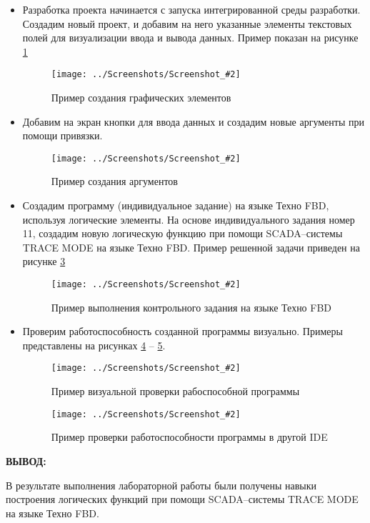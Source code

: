 \documentclass[14pt,a4paper]{extreport}
\newcommand{\sshot}[2]{\begin{figure}[ht]%
\centering\texttt{[image: ../Screenshots/Screenshot\_\#2]}%
\caption{#1}%
\label{sshot#2}%
\end{figure}%
}
\newcommand{\header}[1]{%
{
\clearpage%
\fontsize{16pt}{14pt}\selectfont
\begin{center}
\textbf{\MakeUppercase{#1}:}
\end{center}
}
}
\begin{document}
\begin{itemize}

\item Разработка проекта начинается с запуска интегрированной среды разработки. Создадим новый проект, и добавим на него указанные элементы текстовых полей для визуализации ввода и вывода данных. Пример показан на рисунке \ref{sshot1}

\sshot{Пример создания графических элементов}{1}

\item Добавим на экран кнопки для ввода данных и создадим новые аргументы при помощи привязки. 

\sshot{Пример создания аргументов}{2}

\clearpage

\item Создадим программу (индивидуальное задание) на языке Техно FBD, используя логические элементы. На основе индивидуального задания номер 11, создадим новую логическую функцию при помощи SCADA–системы TRACE MODE на языке Техно FBD. Пример решенной задачи приведен на рисунке \ref{sshot3}

\sshot{Пример выполнения контрольного задания на языке Техно FBD}{3}

\clearpage

\item Проверим работоспособность созданной программы визуально. Примеры представлены на рисунках \ref{sshot4} -- \ref{sshot5}.

\sshot{Пример визуальной проверки рабоспособной программы}{4}

\sshot{Пример проверки работоспособности программы в другой IDE}{5}

\end{itemize}

\header{Вывод}


В результате выполнения лабораторной работы были получены навыки построения логических функций при помощи SCADA--системы TRACE MODE на языке Техно FBD.
\end{document}
